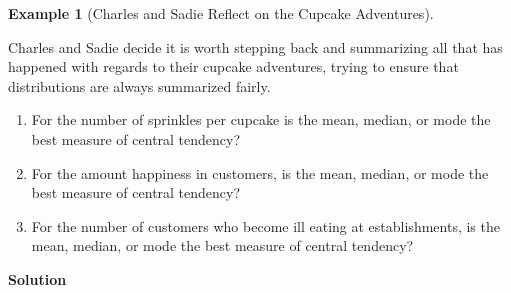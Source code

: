 \documentclass[
  letterpaper,
  DIV=11,
  numbers=noendperiod]{scrreprt}
\providecommand{\tightlist}{%
  \setlength{\itemsep}{0pt}\setlength{\parskip}{0pt}}\usepackage{longtable,booktabs,array}
\theoremstyle{definition}
\theoremstyle{definition}
\theoremstyle{definition}
\newtheorem{example}{Example}[chapter]
\theoremstyle{remark}
\begin{document}
\begin{example}[Charles and Sadie Reflect on the Cupcake
Adventures]\protect\hypertarget{exm-choosing-measure-of-central-tendency}{}\label{exm-choosing-measure-of-central-tendency}

Charles and Sadie decide it is worth stepping back and summarizing all
that has happened with regards to their cupcake adventures, trying to
ensure that distributions are always summarized fairly.

\begin{enumerate}
\def\labelenumi{\alph{enumi}.}
\tightlist
\item
  For the number of sprinkles per cupcake is the mean, median, or mode
  the best measure of central tendency?
\item
  For the amount happiness in customers, is the mean, median, or mode
  the best measure of central tendency?
\item
  For the number of customers who become ill eating at establishments,
  is the mean, median, or mode the best measure of central tendency?
\end{enumerate}

\begin{tcolorbox}[enhanced jigsaw, colback=white, breakable, rightrule=.15mm, leftrule=.75mm, toprule=.15mm, left=2mm, arc=.35mm, opacityback=0, bottomrule=.15mm]

\vspace{-3mm}\textbf{Solution}\vspace{3mm}


\end{tcolorbox}
\end{example}
\end{document}
